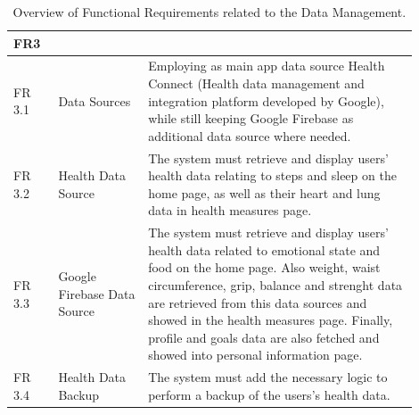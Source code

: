 \begin{table}[h!]
    \setstretch{\myspacing}
    \centering
    \begin{tabular}{|>{\raggedright\arraybackslash}p{0.1\linewidth}|>{\raggedright\arraybackslash}p{0.2\linewidth}|>{\raggedright\arraybackslash}p{0.6\linewidth}|}
        \hline
        \textbf{FR3} & \multicolumn{2}{>{\centering\arraybackslash}p{0.7\linewidth}|}{\textbf{Data Management}} \\
        \hline
        FR 3.1 & Data Sources & Employing as main app data source Health Connect (Health data management and integration platform developed by Google), while still keeping Google Firebase as additional data source where needed. \\
        \hline
        FR 3.2 & Health Data Source & The system must retrieve and display users' health data relating to steps and sleep on the home page, as well as their heart and lung data in health measures page. \\
        \hline
        FR 3.3 & Google Firebase Data Source & The system must retrieve and display users' health data related to emotional state and food on the home page. Also weight, waist circumference, grip, balance and strenght data are retrieved from this data sources and showed in the health measures page. Finally, profile and goals data are also fetched and showed into personal information page. \\
        \hline
        FR 3.4 & Health Data Backup & The system must add the necessary logic to perform a backup of the users's health data. \\
        \hline
    \end{tabular}
    \caption{Overview of Functional Requirements related to the Data Management.}
    \label{tab:fr3}
\end{table}

